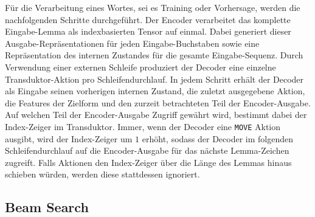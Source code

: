 \documentclass[11pt,a4paper]{article}
\newcommand{\action}[1]{\texttt{#1}}
\begin{document}
Für die Verarbeitung eines Wortes, sei es Training oder Vorhersage, werden die nachfolgenden Schritte durchgeführt.
Der Encoder verarbeitet das komplette Eingabe-Lemma als indexbasierten Tensor auf einmal. Dabei generiert dieser Ausgabe-Repräsentationen für jeden Eingabe-Buchstaben sowie eine Repräsentation des internen Zustandes für die gesamte Eingabe-Sequenz.
Durch Verwendung einer externen Schleife produziert der Decoder eine einzelne Transduktor-Aktion pro Schleifendurchlauf.
In jedem Schritt erhält der Decoder als Eingabe seinen vorherigen internen Zustand, die zuletzt ausgegebene Aktion, die Features der Zielform und den zurzeit betrachteten Teil der Encoder-Ausgabe. Auf welchen Teil der Encoder-Ausgabe Zugriff gewährt wird, bestimmt dabei der Index-Zeiger im Transduktor.
Immer, wenn der Decoder eine \action{MOVE} Aktion ausgibt, wird der Index-Zeiger um $1$ erhöht, sodass der Decoder im folgenden Schleifendurchlauf auf die Encoder-Ausgabe für das nächste Lemma-Zeichen zugreift.
Falls Aktionen den Index-Zeiger über die Länge des Lemmas hinaus schieben würden, werden diese stattdessen ignoriert.

\subsection{Beam Search}

\end{document}
